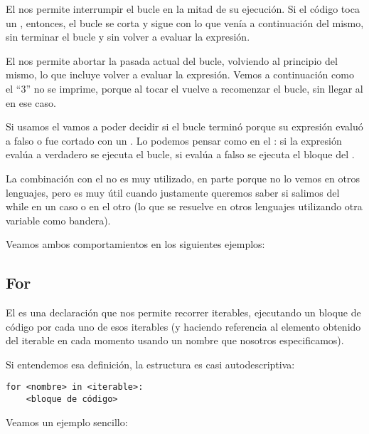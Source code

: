 El  nos permite interrumpir el bucle en la mitad de su ejecución. Si el código toca un , entonces, el bucle se corta y sigue con lo que venía a continuación del mismo, sin terminar el bucle y sin volver a evaluar la expresión.


El  nos permite abortar la pasada actual del bucle, volviendo al principio del mismo, lo que incluye volver a evaluar la expresión. Vemos a continuación como el ``3'' no se imprime, porque al tocar el  vuelve a recomenzar el bucle, sin llegar al  en ese caso.


Si usamos el  vamos a poder decidir si el bucle  terminó porque su expresión evaluó a falso o fue cortado con un . Lo podemos pensar como en el : si la expresión evalúa a verdadero se ejecuta el bucle, si evalúa a falso se ejecuta el bloque del .

La combinación  con el  no es muy utilizado, en parte porque no lo vemos en otros lenguajes, pero es muy útil cuando justamente queremos saber si salimos del while en un caso o en el otro (lo que se resuelve en otros lenguajes utilizando otra variable como bandera).

Veamos ambos comportamientos en los siguientes ejemplos:



\subsection{For}\label{sub:for}

El  es una declaración que nos permite recorrer iterables, ejecutando un bloque de código por cada uno de esos iterables (y haciendo referencia al elemento obtenido del iterable en cada momento usando un nombre que nosotros especificamos).

Si entendemos esa definición, la estructura es casi autodescriptiva:

\begin{verbatim}
for <nombre> in <iterable>:
    <bloque de código>
\end{verbatim}

Veamos un ejemplo sencillo:


